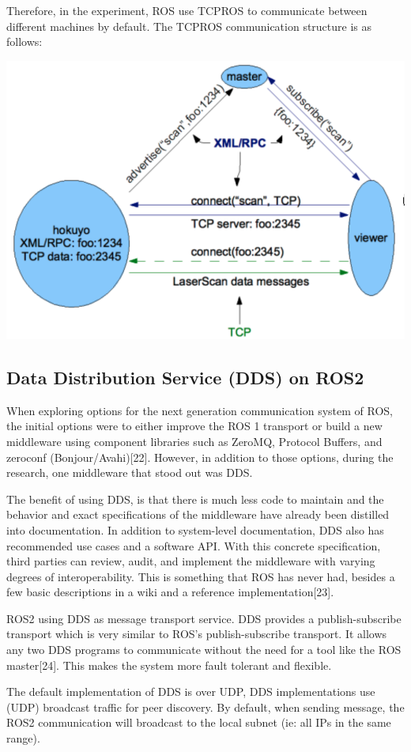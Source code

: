 \documentclass{mproj}
\begin{document}
Therefore, in the experiment, ROS use TCPROS to communicate between different machines by default.
The TCPROS communication structure is as follows:

\includegraphics[width = .7\textwidth]{d.png}

\subsection{Data Distribution Service (DDS) on ROS2}
When exploring options for the next generation communication system of ROS, the initial options were to either improve the ROS 1 transport or build a new middleware using component libraries such as ZeroMQ, Protocol Buffers, and zeroconf (Bonjour/Avahi)[22]. However, in addition to those options, during the research, one middleware that stood out was DDS.

The benefit of using DDS, is that there is much less code to maintain and the behavior and exact specifications of the middleware have already been distilled into documentation. In addition to system-level documentation, DDS also has recommended use cases and a software API. With this concrete specification, third parties can review, audit, and implement the middleware with varying degrees of interoperability. This is something that ROS has never had, besides a few basic descriptions in a wiki and a reference implementation[23].

ROS2 using DDS as message transport service. DDS provides a publish-subscribe transport which is very similar to ROS’s publish-subscribe transport. It allows any two DDS programs to communicate without the need for a tool like the ROS master[24]. This makes the system more fault tolerant and flexible.

The default implementation of DDS is over UDP,  DDS implementations use (UDP) broadcast traffic for peer discovery. By default, when sending message, the ROS2 communication will broadcast to the local subnet (ie: all IPs in the same range).
\end{document}
